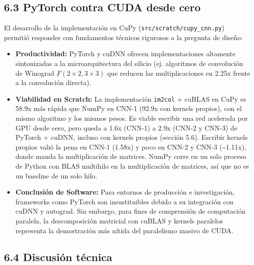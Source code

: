 \documentclass[
  11pt,
]{article}
\providecommand{\tightlist}{%
  \setlength{\itemsep}{0pt}\setlength{\parskip}{0pt}}
\begin{document}
\subsection{6.3 PyTorch contra CUDA desde cero}\label{discusiuxf3n-pytorch-vs-cuda-python-puro}

El desarrollo de la implementación en CuPy
(\texttt{src/scratch/cupy\_cnn.py}) permitió responder con
fundamentos técnicos rigurosos a la pregunta de diseño:

\begin{itemize}
\tightlist
\item
  \textbf{Productividad:} PyTorch y cuDNN ofrecen
  implementaciones altamente sintonizadas a la
  microarquitectura del silicio (ej. algoritmos de
  convolución de Winograd \(F(2 \times 2, 3 \times 3)\) que
  reducen las multiplicaciones en 2.25x frente a la
  convolución directa).
\item
  \textbf{Viabilidad en Scratch:} La implementación
  \texttt{im2col} + cuBLAS en CuPy es 58.9x más
  rápida que NumPy en CNN-1 (92.9x con kernels propios),
  con el mismo algoritmo y los mismos pesos. Es viable
  escribir una red acelerada por GPU desde cero, pero queda
  a 1.6x (CNN-1) a 2.9x (CNN-2 y CNN-3) de PyTorch + cuDNN,
  incluso con kernels propios (sección 5.6). Escribir
  kernels propios valió la pena en CNN-1 (1.58x) y poco en
  CNN-2 y CNN-3 (\textasciitilde1.11x), donde manda la
  multiplicación de matrices. NumPy corre en un solo proceso
  de Python con BLAS multihilo en la multiplicación de
  matrices, así que no es un baseline de un solo hilo.
\item
  \textbf{Conclusión de Software:} Para entornos de
  producción e investigación, frameworks como PyTorch son
  insustituibles debido a su integración con cuDNN y
  autograd. Sin embargo, para fines de comprensión de
  computación paralela, la descomposición matricial con
  cuBLAS y kernels paralelos representa la demostración más
  nítida del paralelismo masivo de CUDA.
\end{itemize}

\subsection{6.4 Discusión técnica}\label{discusion-tecnica}
\end{document}
